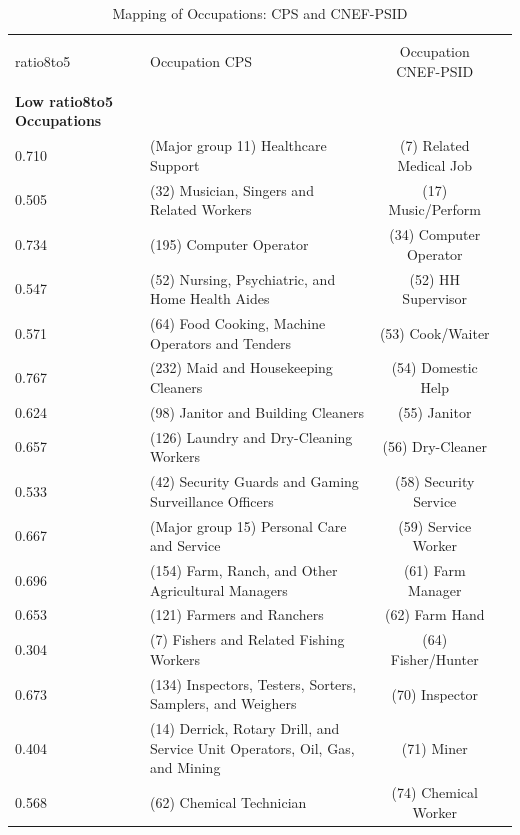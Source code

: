 \def\sep{0.5em}
\def\fns{\footnotesize}
\begin{table}[htpb]\centering
    \caption{Mapping of Occupations: CPS and CNEF-PSID}
    \tiny

\begin{tabular}{llcc}
\hline
   \\[.5em]
ratio8to5 & Occupation CPS &Occupation CNEF-PSID\\[.5em]

\hline
   \\[.5em]

\textbf{Low ratio8to5 Occupations} &                \\[.5em]



0.710  &  (Major group 11)  Healthcare Support &(7) Related Medical Job\\[.5em]
 0.505 & (32)  Musician, Singers and Related Workers &(17) Music/Perform\\[.5em]
 0.734 & (195) Computer Operator                     &(34) Computer Operator\\[.5em]
   0.547    &  (52) Nursing, Psychiatric, and Home Health Aides                                           &(52) HH Supervisor\\[.5em]
 
 0.571  & (64)   Food Cooking, Machine Operators and Tenders        &(53) Cook/Waiter\\[.5em]
 0.767  &  (232) Maid and Housekeeping Cleaners                     &(54) Domestic Help\\[.5em]
 0.624  &  (98)  Janitor and Building Cleaners                      &(55) Janitor\\[.5em]
 0.657  &  (126) Laundry and Dry-Cleaning Workers                   &(56) Dry-Cleaner\\[.5em]
 0.533  &  (42)  Security Guards and Gaming Surveillance Officers   &(58) Security Service\\[.5em]
 0.667   & (Major group 15)  Personal Care and Service              &(59) Service Worker\\[.5em]
 
 0.696  &  (154) Farm, Ranch, and Other Agricultural Managers &(61) Farm Manager\\[.5em]
 0.653 &  (121) Farmers and Ranchers &(62) Farm Hand\\[.5em]
 0.304 &  (7) Fishers and Related Fishing Workers &(64) Fisher/Hunter\\[.5em]

 0.673 &  (134) Inspectors, Testers, Sorters, Samplers, and Weighers &(70) Inspector\\[.5em]
 0.404 &  (14) Derrick, Rotary Drill, and Service Unit Operators, Oil, Gas, and Mining &(71) Miner\\[.5em]
 0.568 &  (62) Chemical Technician &(74) Chemical Worker\\[.5em]


\end{tabular}
\end{table}
